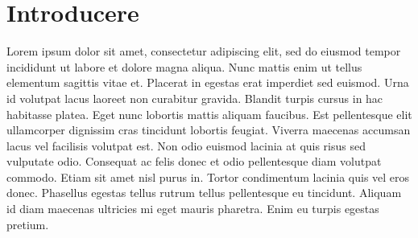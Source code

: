 \chapter*{Introducere} 

Lorem ipsum dolor sit amet, consectetur adipiscing elit, sed do eiusmod tempor incididunt ut labore et dolore magna aliqua. Nunc 
mattis enim ut tellus elementum sagittis vitae et. Placerat in egestas erat imperdiet sed euismod. Urna id volutpat lacus laoreet 
non curabitur gravida. Blandit turpis cursus in hac habitasse platea. Eget nunc lobortis mattis aliquam faucibus. Est pellentesque 
elit ullamcorper dignissim cras tincidunt lobortis feugiat. Viverra maecenas accumsan lacus vel facilisis volutpat est. Non odio 
euismod lacinia at quis risus sed vulputate odio. Consequat ac felis donec et odio pellentesque diam volutpat commodo. Etiam sit 
amet nisl purus in. Tortor condimentum lacinia quis vel eros donec. Phasellus egestas tellus rutrum tellus pellentesque eu tincidunt. 
Aliquam id diam maecenas ultricies mi eget mauris pharetra. Enim eu turpis egestas pretium.
